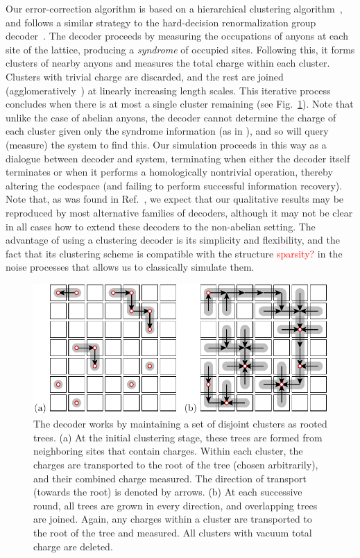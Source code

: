 \documentclass[aps, prl, letterpaper, twocolumn, superscriptaddress, notitlepage, 10pt]{revtex4}
\newcommand{\Fref}[1]{Fig.~\ref{#1}}
\newcommand{\dude}[1]{\textcolor{red}{#1}}
\begin{document}
Our error-correction algorithm is
based on a hierarchical clustering algorithm~\cite{Hastie2009, Wootton2015b},
and follows a similar strategy to the hard-decision renormalization group decoder~\cite{Bravyi2011}. 
The decoder proceeds by measuring the occupations of 
anyons at each site of the lattice, producing a \emph{syndrome} 
of occupied sites. Following this, it forms clusters of nearby anyons and 
measures the total charge within each cluster.
Clusters with trivial charge are discarded, and
the rest are joined (agglomeratively~\cite{Hastie2009})
at linearly increasing length scales. This iterative process concludes when 
there is at most a single cluster remaining (see \Fref{f:decode}).
Note that unlike the case of abelian anyons, the decoder
cannot determine the charge of each cluster given only the syndrome information (as in \cite{Bravyi2011}),
and so will query (measure) the system to find this.
Our simulation proceeds in this way as a dialogue between decoder
and system, terminating when either the decoder itself terminates or 
when it performs a homologically nontrivial operation, thereby altering the 
codespace (and failing to perform successful information recovery).
Note that, as was found in Ref.~\cite{Brell2013}, we expect that 
our qualitative results may be reproduced by most alternative families 
of decoders, although it may not be clear in all cases how to extend these decoders to the non-abelian setting.
The advantage of using a clustering decoder is 
its simplicity and flexibility, and the fact that its clustering 
scheme is compatible with the structure \dude{sparsity?} in the noise 
processes that allows us to classically simulate them.

\begin{figure}[t!]
\begin{center}
	\includegraphics[width=1.0\columnwidth]{pic-decode.pdf}
\caption{The decoder works by maintaining a set of disjoint clusters as rooted trees.
(a) At the initial clustering stage, these trees are formed 
from neighboring sites that contain charges. Within each cluster, the 
charges are transported to the root of the tree (chosen 
arbitrarily), and their combined charge measured. The direction of transport 
(towards the root) is denoted by arrows.
(b) At each successive round, all trees are grown in 
every direction, and overlapping trees are joined. Again, any charges 
within a cluster are transported to the root of the 
tree and measured. All clusters with vacuum total charge are deleted.
\label{f:decode}
}
\end{center}
\vspace{-10pt}
\end{figure}
\end{document}
